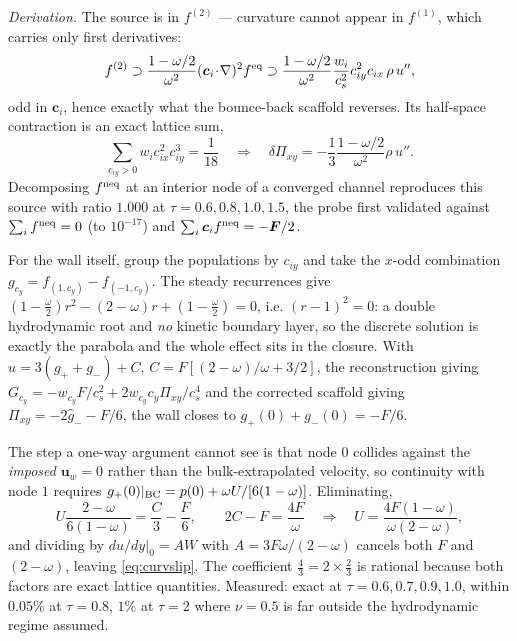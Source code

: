 \documentclass[11pt,a4paper]{article}
\newcommand{\cs}{c_s}
\newcommand{\ci}{\bm{c}_i}
\newcommand{\uu}{\bm{u}}
\begin{document}
\begin{enumerate}[leftmargin=1.4em,itemsep=4pt]
  \emph{Derivation.} The source is in $f^{(2)}$ --- curvature cannot appear in
  $f^{(1)}$, which carries only first derivatives:
  \begin{equation}
    f^{(2)} \supset \frac{1-\omega/2}{\omega^{2}}(\ci\!\cdot\!\nabla)^2 f^{\rm eq}
            \supset \frac{1-\omega/2}{\omega^{2}}\frac{w_i}{\cs^2}
                    c_{iy}^{2}c_{ix}\,\rho\,u'' ,
  \end{equation}
  odd in $\ci$, hence exactly what the bounce-back scaffold reverses. Its
  half-space contraction is an exact lattice sum,
  \begin{equation}
    \sum_{c_{iy}>0} w_i c_{ix}^{2}c_{iy}^{3} = \frac{1}{18}
    \quad\Longrightarrow\quad
    \delta\Pi_{xy} = -\frac13\frac{1-\omega/2}{\omega^{2}}\rho\,u'' .
  \end{equation}
  Decomposing $f^{\rm neq}$ at an interior node of a converged channel
  reproduces this source with ratio $1.000$ at $\tau=0.6,0.8,1.0,1.5$, the probe
  first validated against $\sum_i f^{\rm neq}=0$ (to $10^{-17}$) and
  $\sum_i\ci f^{\rm neq}=-\bm F/2$.

  For the wall itself, group the populations by $c_{iy}$ and take the $x$-odd
  combination $g_{c_y}=f_{(1,c_y)}-f_{(-1,c_y)}$. The steady recurrences give
  $(1-\tfrac\omega2)r^2-(2-\omega)r+(1-\tfrac\omega2)=0$, i.e. $(r-1)^2=0$: a
  double hydrodynamic root and \emph{no} kinetic boundary layer, so the discrete
  solution is exactly the parabola and the whole effect sits in the closure. With
  $u=3(g_++g_-)+C$, $C=F[(2-\omega)/\omega+3/2]$, the reconstruction giving
  $G_{c_y}=-w_{c_y}F/\cs^2+2w_{c_y}c_y\Pi_{xy}/\cs^4$ and the corrected scaffold
  giving $\Pi_{xy}=-2\hat g_--F/6$, the wall closes to $g_+(0)+g_-(0)=-F/6$.

  The step a one-way argument cannot see is that node $0$ collides against the
  \emph{imposed} $\uu_w=0$ rather than the bulk-extrapolated velocity, so
  continuity with node $1$ requires
  $g_+(0)|_{\rm BC}=p(0)+\omega U/[6(1-\omega)]$. Eliminating,
  \begin{equation}
    U\frac{2-\omega}{6(1-\omega)} = \frac{C}{3}-\frac{F}{6},
    \qquad 2C-F=\frac{4F}{\omega}
    \quad\Longrightarrow\quad
    U = \frac{4F(1-\omega)}{\omega(2-\omega)} ,
  \end{equation}
  and dividing by $du/dy|_0=AW$ with $A=3F\omega/(2-\omega)$ cancels both $F$
  and $(2-\omega)$, leaving \eqref{eq:curvslip}. The coefficient
  $\tfrac43=2\times\tfrac23$ is rational because both factors are exact lattice
  quantities. Measured: exact at $\tau=0.6,0.7,0.9,1.0$, within $0.05\%$ at
  $\tau=0.8$, $1\%$ at $\tau=2$ where $\nu=0.5$ is far outside the hydrodynamic
  regime assumed.


\end{enumerate}
\end{document}
